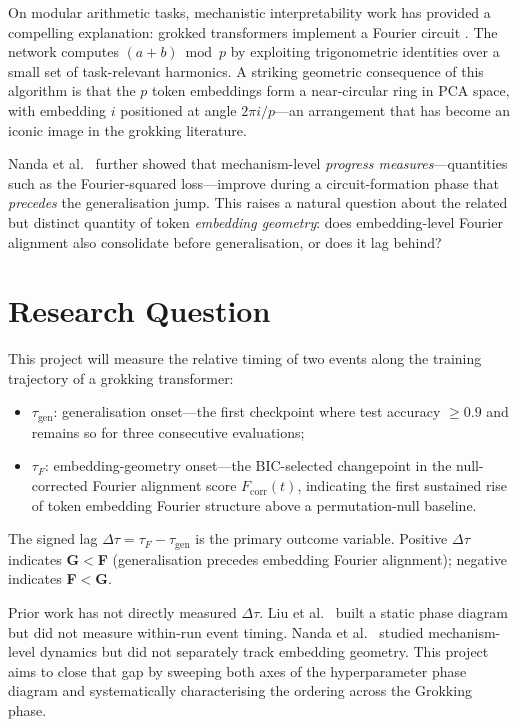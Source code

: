 \documentclass[12pt,openany,oneside,a4paper]{book}
\newcommand{\taug}{\tau_{\mathrm{gen}}}
\newcommand{\tauf}{\tau_{F}}
\newcommand{\Dtau}{\Delta\tau}
\newcommand{\fcorr}{F_{\mathrm{corr}}}
\begin{document}
On modular arithmetic tasks, mechanistic interpretability work has
provided a compelling explanation: grokked transformers implement a
Fourier circuit \cite{nanda2023progress}.
The network computes $(a+b)\bmod p$ by exploiting trigonometric
identities over a small set of task-relevant harmonics.
A striking geometric consequence of this algorithm is that the $p$
token embeddings form a near-circular ring in PCA space, with
embedding $i$ positioned at angle $2\pi i/p$---an arrangement that
has become an iconic image in the grokking literature.

Nanda et al.\ \cite{nanda2023progress} further showed that mechanism-level
\emph{progress measures}---quantities such as the Fourier-squared
loss---improve during a circuit-formation phase that \emph{precedes}
the generalisation jump.
This raises a natural question about the related but distinct quantity
of token \emph{embedding geometry}: does embedding-level Fourier
alignment also consolidate before generalisation, or does it lag behind?

\section{Research Question}

This project will measure the relative timing of two events along
the training trajectory of a grokking transformer:
\begin{itemize}
  \item $\taug$: generalisation onset---the first checkpoint where test
    accuracy $\geq 0.9$ and remains so for three consecutive evaluations;
  \item $\tauf$: embedding-geometry onset---the BIC-selected changepoint
    in the null-corrected Fourier alignment score $\fcorr(t)$, indicating
    the first sustained rise of token embedding Fourier structure above
    a permutation-null baseline.
\end{itemize}
The signed lag $\Dtau = \tauf - \taug$ is the primary outcome variable.
Positive $\Dtau$ indicates \textbf{G$<$F} (generalisation precedes
embedding Fourier alignment); negative indicates \textbf{F$<$G}.

Prior work has not directly measured $\Dtau$.
Liu et al.\ \cite{liu2022towards} built a static phase diagram but did
not measure within-run event timing.
Nanda et al.\ \cite{nanda2023progress} studied mechanism-level dynamics
but did not separately track embedding geometry.
This project aims to close that gap by sweeping both axes of the
hyperparameter phase diagram and systematically characterising the
ordering across the Grokking phase.
\end{document}
